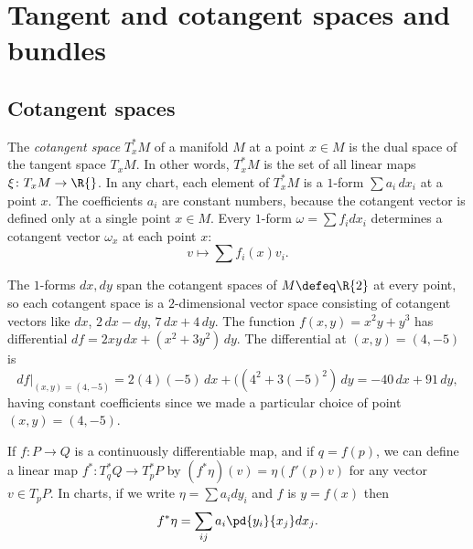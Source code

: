 \chapter{Tangent and cotangent spaces and bundles}
\section{Cotangent spaces}
The \emph{cotangent space} \(T^*_x M\)%
of a manifold \(M\) at a point \(x \in M\) is the dual space of the tangent space \(T_x  M\).
In other words, \(T^*_x M\) is the set of all linear maps \(\xi \colon T_x M \to \R{}\).
In any chart, each element of \(T^*_x M\) is a \(1\)-form \(\sum a_i \, dx_i\) at a point \(x\).
The coefficients \(a_i\) are constant numbers, because the cotangent vector is defined only at a single point \(x \in M\).
Every \(1\)-form \(\omega = \sum f_i dx_i\) determines a cotangent vector \(\omega_x\) at each point \(x\):
\[
v \mapsto \sum f_i(x) v_i.
\]
\begin{example}
The \(1\)-forms \(dx,dy\) span the cotangent spaces of \(M\defeq\R{2}\) at every point, so each cotangent space is a \(2\)-dimensional vector space consisting of cotangent vectors like \(dx\), \(2 \, dx - dy\), \(7 \, dx + 4 \, dy\).
The function \(f(x,y)=x^2y+y^3\) has differential \(df=2xy \, dx + (x^2+3y^2)\, dy\).
The differential at \((x,y)=(4,-5)\) is 
\[
\left.df\right|_{(x,y)=(4,-5)}=2(4)(-5) \, dx + ((4^2+3(-5)^2) \, dy = -40 \, dx + 91 \, dy,
\] 
having constant coefficients since we made a particular choice of point \((x,y)=(4,-5)\).
\end{example}
If \(f \colon P \to Q\) is a continuously differentiable map, and if \(q=f(p)\), we can define a linear map \(f^* \colon T^*_q Q \to T^*_p P\) by \((f^* \eta)(v) = \eta(f'(p)v)\) for any vector \(v \in T_p P\).
In charts, if we write \(\eta=\sum a_i dy_i\) and \(f\) is \(y=f(x)\) then 
\[
f^* \eta = \sum_{ij} a_i \pd{y_i}{x_j} dx_j.
\]
